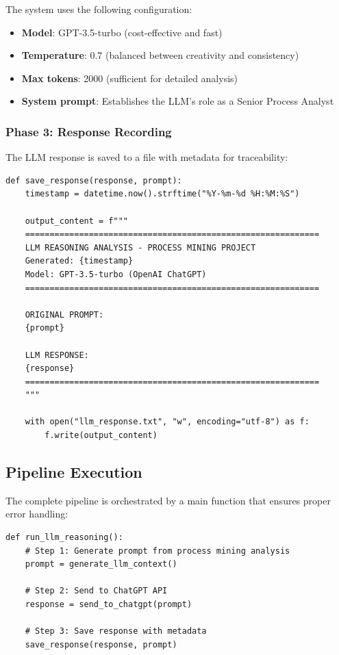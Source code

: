 \documentclass[a4paper,twoside,12pt]{article}
\begin{document}
The system uses the following configuration:
\begin{itemize}
    \item \textbf{Model}: GPT-3.5-turbo (cost-effective and fast)
    \item \textbf{Temperature}: 0.7 (balanced between creativity and consistency)
    \item \textbf{Max tokens}: 2000 (sufficient for detailed analysis)
    \item \textbf{System prompt}: Establishes the LLM's role as a Senior Process Analyst
\end{itemize}

\subsubsection{Phase 3: Response Recording}

The LLM response is saved to a file with metadata for traceability:

\begin{lstlisting}[caption={Response saving with metadata}]
def save_response(response, prompt):
    timestamp = datetime.now().strftime("%Y-%m-%d %H:%M:%S")
    
    output_content = f"""
    ============================================================
    LLM REASONING ANALYSIS - PROCESS MINING PROJECT
    Generated: {timestamp}
    Model: GPT-3.5-turbo (OpenAI ChatGPT)
    ============================================================
    
    ORIGINAL PROMPT:
    {prompt}
    
    LLM RESPONSE:
    {response}
    ============================================================
    """
    
    with open("llm_response.txt", "w", encoding="utf-8") as f:
        f.write(output_content)
\end{lstlisting}

\subsection{Pipeline Execution}

The complete pipeline is orchestrated by a main function that ensures proper error handling:

\begin{lstlisting}[caption={Main orchestration function}]
def run_llm_reasoning():
    # Step 1: Generate prompt from process mining analysis
    prompt = generate_llm_context()
    
    # Step 2: Send to ChatGPT API
    response = send_to_chatgpt(prompt)
    
    # Step 3: Save response with metadata
    save_response(response, prompt)
\end{lstlisting}
\end{document}
